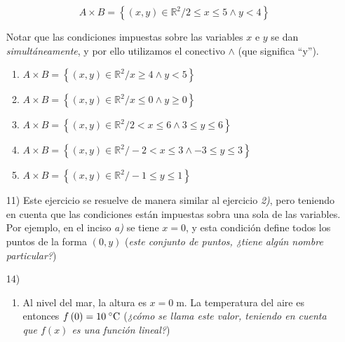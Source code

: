 \documentclass[12pt]{article}
\newcommand{\grad}{\hspace{-2mm}$\phantom{a}^{\circ}$} %
\begin{document}
\begin{enumerate}
$$A \times B = \left\{\left(x,y\right) \in \mathbb{R}^2 / 2 \leq x \leq 5 \wedge y < 4\right\}$$

Notar que las condiciones impuestas sobre las variables $x$ e $y$ se dan \textit{simultáneamente}, y por ello utilizamos el conectivo $\wedge$ (que significa ``y'').

\begin{enumerate}
	 \addtocounter{enumii}{1}
	 \item $A \times B = \left\{\left(x,y\right) \in \mathbb{R}^2 / x \geq 4 \wedge y < 5\right\}$
	 
	 \item $A \times B = \left\{\left(x,y\right) \in \mathbb{R}^2 / x \leq 0 \wedge y \geq 0\right\}$
	 
	 \item $A \times B = \left\{\left(x,y\right) \in \mathbb{R}^2 / 2 < x \leq 6 \wedge 3 \leq y \leq 6\right\}$
	 
	 \item $A \times B = \left\{\left(x,y\right) \in \mathbb{R}^2 / -2 < x \leq 3 \wedge -3 \leq y \leq 3\right\}$
	 
	 \item $A \times B = \left\{\left(x,y\right) \in \mathbb{R}^2 / -1 \leq y \leq 1\right\}$
\end{enumerate}
\item[11)] Este ejercicio se resuelve de manera similar al ejercicio \textit{2)}, pero teniendo en cuenta que las condiciones están impuestas sobra una sola de las variables. Por ejemplo, en el inciso \textit{a)} se tiene $x = 0$, y esta condición define todos los puntos de la forma $\left(0,y\right)$ (\textit{este conjunto de puntos, ¿tiene algún nombre particular?})

\item[14)] 
  \begin{enumerate}
	\item Al nivel del mar, la altura es $x = 0\;\text{m}$. La temperatura del aire es entonces $f\left(0\right) = 10\;\text{\grad C}$ (\textit{¿cómo se llama este valor, teniendo en cuenta que $f(x)$ es una función lineal?})


\end{enumerate}
\end{enumerate}
\end{document}
